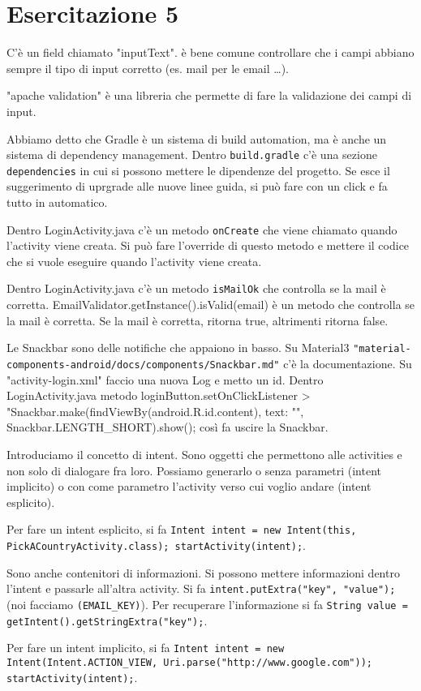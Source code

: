 
\chapter{Esercitazione 5}
C'è un field chiamato "inputText". è bene comune controllare che i campi abbiano sempre il tipo di input corretto (es. mail per le email \dots).
\par "apache validation" è una libreria che permette di fare la validazione dei campi di input.
\par Abbiamo detto che Gradle è un sistema di build automation, ma è anche un sistema di dependency management. Dentro \texttt{build.gradle} c'è una sezione \texttt{dependencies} in cui si possono mettere le dipendenze del progetto. Se esce il suggerimento di uprgrade alle nuove linee guida, si può fare con un click e fa tutto in automatico.
\par Dentro LoginActivity.java c'è un metodo \texttt{onCreate} che viene chiamato quando l'activity viene creata. Si può fare l'override di questo metodo e mettere il codice che si vuole eseguire quando l'activity viene creata.
\par Dentro LoginActivity.java c'è un metodo \texttt{isMailOk} che controlla se la mail è corretta. EmailValidator.getInstance().isValid(email) è un metodo che controlla se la mail è corretta. Se la mail è corretta, ritorna true, altrimenti ritorna false.
\par Le Snackbar sono delle notifiche che appaiono in basso. Su Material3 \texttt{"material-components-android/docs/components/Snackbar.md"} c'è la documentazione. Su "activity-login.xml" faccio una nuova Log e metto un id. Dentro LoginActivity.java metodo loginButton.setOnClickListener > "Snackbar.make(findViewBy(android.R.id.content), text: "", Snackbar.LENGTH\_SHORT).show(); così fa uscire la Snackbar.
\par Introduciamo il concetto di intent. Sono oggetti che permettono alle activities e non solo di dialogare fra loro. Possiamo generarlo o senza parametri (intent implicito) o con come parametro l'activity verso cui voglio andare (intent esplicito).
\par Per fare un intent esplicito, si fa \texttt{Intent intent = new Intent(this, PickACountryActivity.class); startActivity(intent);}. 
\par Sono anche contenitori di informazioni. Si possono mettere informazioni dentro l'intent e passarle all'altra activity. Si fa \texttt{intent.putExtra("key", "value");} (noi facciamo \texttt{(EMAIL\_KEY)}). Per recuperare l'informazione si fa \texttt{String value = getIntent().getStringExtra("key");}.
\par Per fare un intent implicito, si fa \texttt{Intent intent = new Intent(Intent.ACTION\_VIEW, Uri.parse("http://www.google.com")); startActivity(intent);}.

